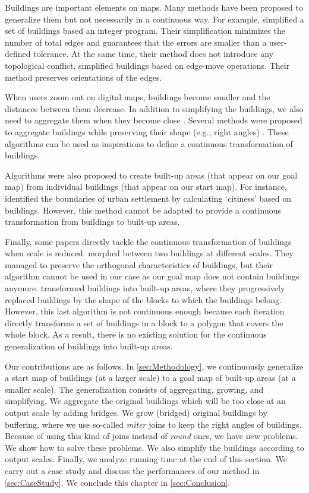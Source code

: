 Buildings are important elements on maps. 
Many methods have been proposed to generalize them 
but not necessarily in a continuous way.
For example, \citet{Haunertwolff2010Building} simplified a set 
of buildings based an integer program.
Their simplification minimizes the number of total edges and guarantees that the errors are smaller than 
a user-defined tolerance.
At the same time, their method does not introduce any topological conflict.
\citet{Buchin2011_Simp} simplified buildings based on 
edge-move operations.
Their method preserves orientations of the edges.

When users zoom out on digital maps, 
buildings become smaller and 
the distances between them decrease. 
In addition to simplifying the buildings,
we also need to aggregate them when they become close  \cite{Weibel1997}. 
Several methods were proposed 
to aggregate buildings while preserving their shape 
(e.g., right angles) 
\citep{Regnauld2001,RegnauldRevell07,Damen2008}. 
These algorithms can be used as inspirations 
to define a continuous transformation of buildings.

Algorithms were also proposed to create 
built-up areas (that appear on our goal map) from 
individual buildings (that appear on our start map). 
For instance, \citet{Chaudhry2008} identified 
the boundaries of urban settlement 
by calculating `citiness' based on buildings. 
However, this method cannot be adapted 
to provide a continuous transformation 
from buildings to built-up areas.

Finally, some papers directly tackle 
the continuous transformation of buildings 
when scale is reduced. 
\citet{Li2017_Building} morphed between two buildings 
at different scales.
They managed to preserve the orthogonal characteristics of 
buildings, but their algorithm cannot be used in our case 
as our goal map does not contain buildings anymore.
\citet{Touya2017Progressive} 
transformed buildings into built-up areas, 
where they progressively replaced buildings 
by the shape of the blocks to which the buildings belong. 
However, this last algorithm is not continuous enough 
because each iteration directly transforms 
a set of buildings in a block to a polygon 
that covers the whole block. 
As a result, there is no existing solution 
for the continuous generalization of buildings 
into built-up areas.


Our contributions are as follows.
In \sect\ref{sec:Methodology},
we continuously generalize a start map of buildings
(at a larger scale) 
to a goal map of built-up areas (at a smaller scale).
The generalization consists of 
aggregating, growing, and simplifying.
We aggregate the original buildings which will be too close 
at an output scale by adding bridges.
We grow (bridged) original buildings by buffering,
where we use so-called \emph{miter} joins to keep the right 
angles of buildings.
Because of using this kind of joins 
instead of \emph{round} ones,
we have new problems.
We show how to solve these problems.
We also simplify the buildings according to output scales.
Finally, we analyze running time at the end of this section.
We carry out a case study 
and discuss the performances of our method in 
\sect\ref{sec:CaseStudy}.
We conclude this chapter in \sect\ref{sec:Conclusion}.

